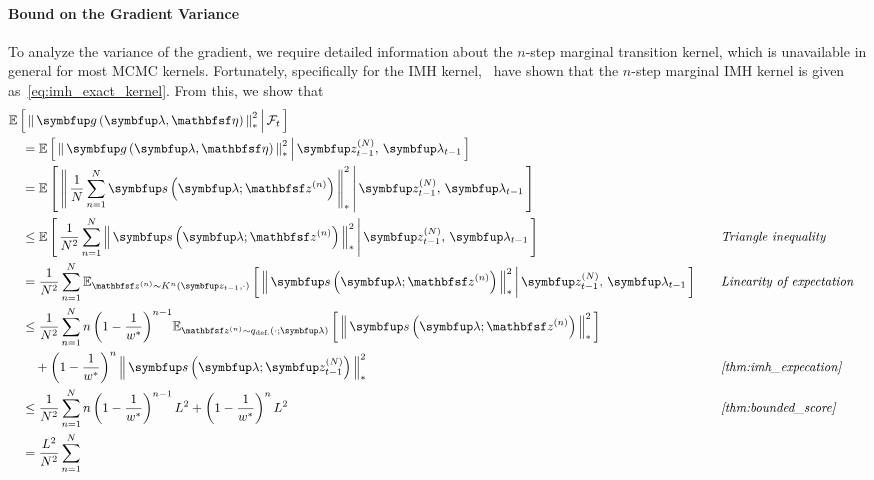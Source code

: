 \begin{proofEnd}
  \paragraph{\textbf{Bound on the Gradient Variance}}
  To analyze the variance of the gradient, we require detailed information about the \(n\)-step marginal transition kernel, which is unavailable in general for most MCMC kernels.
  Fortunately, specifically for the IMH kernel,~\citet{Smith96exacttransition} have shown that the \(n\)-step marginal IMH kernel is given as~\cref{eq:imh_exact_kernel}.
  From this, we show that
  \begin{alignat}{2}
    &\E{ \norm{ \vg\left(\vlambda, \rvveta\right) }^2_{*} \,\middle|\, \mathcal{F}_{t} }
    \nonumber
    \\
    &\quad=
    \E{ \norm{ \vg\left(\vlambda, \rvveta\right) }^2_{*} \,\middle|\, \vz_{t-1}^{(N)},\, \vlambda_{t-1} }
    \nonumber
    \\
    &\quad=
    \E{ \norm{ \frac{1}{N}\sum^{N}_{n=1} \vs\left(\vlambda; \rvvz^{(n)}\right) }^2_{*} \,\middle|\, \vz_{t-1}^{(N)},\, \vlambda_{t-1} }
    \nonumber
    \\
    &\quad\leq
    \E{ \frac{1}{N^2} \sum^{N}_{n=1} \norm{\vs\left(\vlambda; \rvvz^{(n)}\right) }^2_{*} \,\middle|\, \vz_{t-1}^{(N)},\, \vlambda_{t-1} }
    &&\quad\text{\textit{Triangle inequality}}
    \nonumber
    \\
    &\quad=
    \frac{1}{N^2}\sum^{N}_{n=1} \Esub{\rvvz^{(n)} \sim K^n\left(\vz_{t-1}, \cdot\right)}{ \norm{\vs\left(\vlambda; \rvvz^{(n)}\right) }^2_{*} \,\middle|\,  \vz_{t-1}^{(N)},\, \vlambda_{t-1} }
    &&\quad\text{\textit{Linearity of expectation}}
    \nonumber
    \\
    &\quad\leq
    \frac{1}{N^2}\sum^{N}_{n=1}
      n \, {\left(1 - \frac{1}{w^*}\right)}^{n-1}
      \Esub{\rvvz^{(n)} \sim q_{\text{def.}}\left(\cdot; \vlambda\right)}{ \norm{\vs\left(\vlambda; \rvvz^{(n)} \right)}_{*}^2 }
      \nonumber
      \\
      &\qquad+ 
        {\left(1 - \frac{1}{w^*}\right)}^{n} \, \norm{\vs\left(\vlambda; \vz_{t-1}^{(N)} \right)}_{*}^2
    &&\quad\text{\textit{\cref{thm:imh_expecation}}}
    \nonumber
    \\
    &\quad\leq
    \frac{1}{N^2}\sum^{N}_{n=1}
      n \, {\left(1 - \frac{1}{w^*}\right)}^{n-1}  \, L^2
      +
      {\left(1 - \frac{1}{w^*}\right)}^{n} \, L^2
    &&\quad\text{\textit{\cref{thm:bounded_score}}}
    \nonumber
    \\
    &\quad=
    \frac{L^2}{N^2}\sum^{N}_{n=1}

\end{alignat}
\end{proofEnd}
